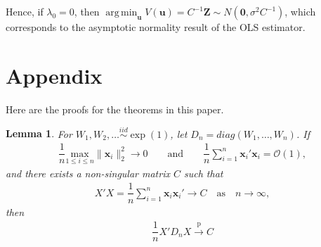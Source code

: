 \documentclass[12pt]{article}
\DeclareMathOperator*{\argmin}{arg\,min} %
\newcommand{\sumin}{\sum_{i=1}^n} %
\newcommand{\dn}{\dfrac{1}{n}} %
\newcommand{\CONV}[1]{\stackrel{\text{#1}}{\longrightarrow}} %
\newcommand{\x}{\bm{x}_i} %
\newcommand{\bu}{\bm{u}} %
\newtheorem{lem}{Lemma}[section]
\begin{document}
Hence, if $\lambda_0 = 0$, then $\argmin_{\bu} V(\bu)= C^{-1} \bm{Z} \sim N \left( \bm{0}, \sigma^2 C^{-1} \right)$, which corresponds to the asymptotic normality result of the OLS estimator. 

\section{Appendix}

Here are the proofs for the theorems in this paper.

\begin{lem} \label{lem_X'DnX}
	For $W_1, W_2, \ldots \stackrel{iid}{\sim} \exp(1)$, let $D_n = diag(W_1, \ldots, W_n)$. If 
		\begin{align*}
		\dn \underset{1 \leq i \leq n}{\text{max}} \| \x \|_2^2 \to 0
		\qquad \text{and} \qquad 
		\dn \sumin \x' \x = \mathcal{O} (1),   
		\end{align*}
	and there exists a non-singular matrix $C$ such that
		\begin{align*}
		X'X = \dn \sumin \x \x' \to C 
		\quad \text{as} \quad n \to \infty,
		\end{align*}
	then
		\begin{align} \label{lemma1result}
		\dn X' D_n X
		\CONV{p} C 
		\end{align}
\end{lem}
\end{document}
